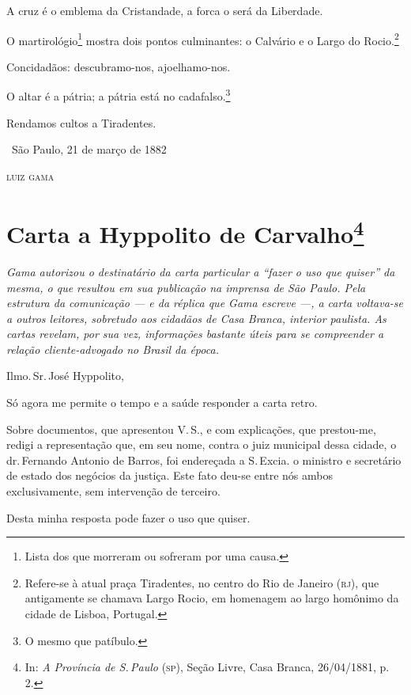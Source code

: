 {A cruz é o emblema da Cristandade, a forca o será da Liberdade.

O martirológio\footnote{Lista dos que morreram ou sofreram por uma
  causa.} mostra dois pontos culminantes: o Calvário e o Largo do
Rocio.\footnote{Refere-se à atual praça Tiradentes, no centro do Rio
  de Janeiro (\textsc{rj}), que antigamente se chamava Largo Rocio, em
  homenagem ao largo homônimo da cidade de Lisboa, Portugal.}

Concidadãos: descubramo-nos, ajoelhamo-nos.

O altar é a pátria; a pátria está no cadafalso.\footnote{O mesmo que
  patíbulo.}

Rendamos cultos a Tiradentes.

\medskip

\hfill\ São Paulo, 21 de março de 1882

\hfill\textsc{luiz gama}

\chapter{Carta a Hyppolito de Carvalho\footnote{In: \emph{A
  Província de S.\,Paulo} (\textsc{sp}), Seção Livre, Casa Branca, 26/04/1881, p.
  2.}}

\begin{resumo}
\emph{Gama autorizou o destinatário da carta particular a ``fazer o uso que quiser''
da mesma, o que resultou em sua publicação na
imprensa de São Paulo. Pela estrutura da comunicação --- e da réplica que
Gama escreve ---, a carta voltava-se a outros
leitores, sobretudo aos cidadãos de Casa Branca, interior paulista. As
cartas revelam, por sua vez, informações bastante úteis para se
compreender a relação cliente-advogado no Brasil da época.}
\end{resumo}

Ilmo.\,Sr.\,José Hyppolito,

Só agora me permite o tempo e a saúde responder a carta retro.

Sobre documentos, que
apresentou V.\,S., e com explicações, que prestou-me, redigi a
representação que, em seu nome, contra o juiz municipal dessa cidade, o
dr.\,Fernando Antonio de Barros, foi endereçada a S.\,Excia. o ministro e
secretário de estado dos negócios da justiça. Este fato deu-se entre nós
ambos exclusivamente, sem intervenção de terceiro.

Desta minha resposta pode fazer o uso que quiser.

}
